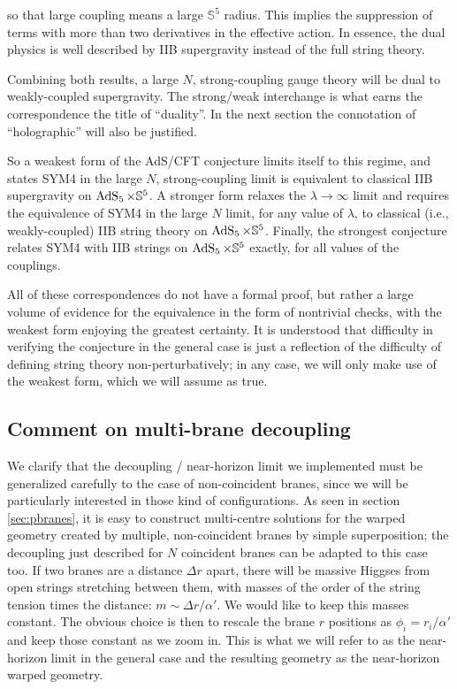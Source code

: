 so that large coupling means a large $\mathbb{S}^5$ radius. This implies the suppression of terms with more than two derivatives in the effective action. In essence, the dual physics is well described by IIB supergravity instead of the full string theory.

Combining both results, a large $N$, strong-coupling gauge theory will be dual to weakly-coupled supergravity. The strong/weak interchange is what earns the correspondence the title of ``duality''. In the next section the connotation of ``holographic'' will also be justified.

So a weakest form of the AdS/CFT conjecture limits itself to this regime, and states SYM4 in the large $N$, strong-coupling limit is equivalent to classical IIB supergravity on $\operatorname{AdS}_{5} \times \mathbb{S}^5$. A stronger form relaxes the $\lambda \rightarrow \infty$ limit and requires the equivalence of SYM4 in the large $N$ limit, for any value of $\lambda$, to classical (i.e., weakly-coupled) IIB string theory on $\operatorname{AdS}_{5} \times \mathbb{S}^5$. Finally, the strongest conjecture relates SYM4 with IIB strings on $\operatorname{AdS}_{5}\times\mathbb{S}^5$ exactly, for all values of the couplings.

All of these correspondences do not have a formal proof, but rather a large volume of evidence for the equivalence in the form of nontrivial checks, with the weakest form enjoying the greatest certainty. It is understood that difficulty in verifying the conjecture in the general case is just a reflection of the difficulty of defining string theory non-perturbatively; in any case, we will only make use of the weakest form, which we will assume as true.

\subsection{Comment on multi-brane decoupling}

We clarify that the decoupling / near-horizon limit we implemented must be generalized carefully to the case of non-coincident branes, since we will be particularly interested in those kind of configurations. As seen in section \ref{sec:pbranes}, it is easy to construct multi-centre solutions for the warped geometry created by multiple, non-coincident branes by simple superposition; the decoupling just described for $N$ coincident branes can be adapted to this case too. If two branes are a distance $\Delta r$ apart, there will be massive Higgses from open strings stretching between them, with masses of the order of the string tension times the distance: $m \sim \Delta r / \alpha'$. We would like to keep this masses constant. The obvious choice is then to rescale the brane $r$ positions as $\phi_i = r_i / \alpha'$ and keep those constant as we zoom in. This is what we will refer to as the near-horizon limit in the general case and the resulting geometry as the near-horizon warped geometry.\\

